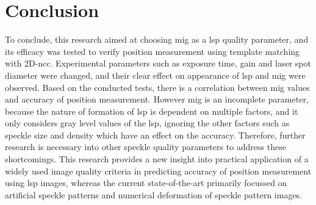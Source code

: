 \chapter{Conclusion}
    To conclude, this research aimed at choosing \gls{mig} as a \gls{lsp} quality parameter, and its efficacy was tested to verify position measurement using template matching with 2D-\gls{ncc}. Experimental parameters such as exposure time, gain and laser spot diameter were changed, and their clear effect on appearance of \gls{lsp} and \gls{mig} were observed. Based on the conducted tests, there is a correlation between \gls{mig} values and accuracy of position measurement. However \gls{mig} is an incomplete parameter, because the nature of formation of \gls{lsp} is dependent on multiple factors, and it only considers gray level values of the \gls{lsp}, ignoring the other factors such as speckle size and density which have an effect on the accuracy. Therefore, further research is necessary into other speckle quality parameters to address these shortcomings. This research provides a new insight into practical application of a widely used image quality criteria in predicting accuracy of position measurement using \gls{lsp} images, whereas the current state-of-the-art primarily focussed on artificial speckle patterns and numerical deformation of speckle pattern images.



